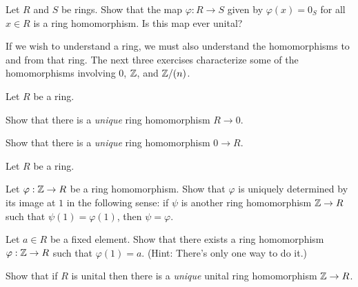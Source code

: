 \begin{exercise}
Let \(R\) and \(S\) be rings.
Show that the map \(\varphi : R \rightarrow S\) given by \(\varphi(x) = 0_S\) for all \(x \in R\) is a ring homomorphism.
Is this map ever unital?
\end{exercise}


If we wish to understand a ring, we must also understand the homomorphisms to and from that ring.
The next three exercises characterize some of the homomorphisms involving \(0\), \(\mathbb{Z}\), and \(\mathbb{Z}/(n)\).


\begin{exercise}
Let \(R\) be a ring.
\begin{proplist*}
\item Show that there is a \emph{unique} ring homomorphism \(R \rightarrow 0\).
\item Show that there is a \emph{unique} ring homomorphism \(0 \rightarrow R\).
\end{proplist*}
\end{exercise}


\begin{exercise} \label{exerc:homs-from-zz}
Let \(R\) be a ring.
\begin{proplist}
\item Let \(\varphi : \mathbb{Z} \rightarrow R\) be a ring homomorphism.
Show that \(\varphi\) is uniquely determined by its image at \(1\) in the following sense: if \(\psi\) is another ring homomorphism \(\mathbb{Z} \rightarrow R\) such that \(\psi(1) = \varphi(1)\), then \(\psi = \varphi\).
\item Let \(a \in R\) be a fixed element.
Show that there exists a ring homomorphism \(\varphi : \mathbb{Z} \rightarrow R\) such that \(\varphi(1) = a\).
(Hint: There's only one way to do it.)
\item Show that if \(R\) is unital then there is a \emph{unique} unital ring homomorphism \(\mathbb{Z} \rightarrow R\).
\end{proplist}
\end{exercise}



